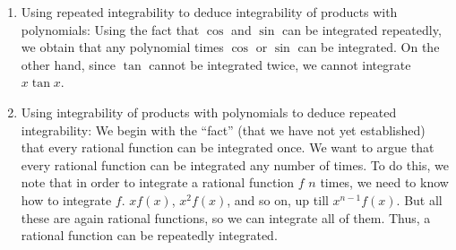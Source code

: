 \documentclass{amsart}
\begin{document}
\begin{enumerate}
\item Using repeated integrability to deduce integrability of products
  with polynomials: Using the fact that $\cos$ and $\sin$ can be
  integrated repeatedly, we obtain that any polynomial times $\cos$ or
  $\sin$ can be integrated. On the other hand, since $\tan$ cannot be
  integrated twice, we cannot integrate $x\tan x$.
\item Using integrability of products with polynomials to deduce
  repeated integrability: We begin with the ``fact'' (that we have not
  yet established) that every rational function can be integrated
  once. We want to argue that every rational function can be
  integrated any number of times. To do this, we note that in order to
  integrate a rational function $f$ $n$ times, we need to know how to
  integrate $f$. $xf(x)$, $x^2f(x)$, and so on, up till
  $x^{n-1}f(x)$. But all these are again rational functions, so we can
  integrate all of them. Thus, a rational function can be repeatedly
  integrated.
\end{enumerate}
\end{document}
